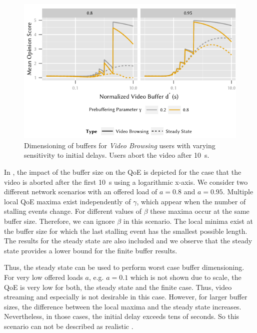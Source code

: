 \begin{figure}
  \centering
  \includegraphics{application/qoe_user_behaviour/user_scenarios/figures/video_browsing}
  \caption{Dimensioning of buffers for \emph{Video Browsing} users with varying  sensitivity to initial delays. Users abort the video after \SI{10}{\second}.}
  \label{fig:application:qoe_user_behaviour:typical_user_scenarios:browsing:video_browsing}
\end{figure}

In , the impact of the buffer size on the \gls{QoE} is depicted for the case that the video is aborted after the first \SI{10}{\second} using a logarithmic x-axis. 
We consider two different network scenarios with an offered load of \(a = 0.8\) and \(a = 0.95\).
Multiple local QoE maxima exist independently of \(\gamma\), which appear when the number of stalling events change. 
For different values of \(\beta\) these maxima occur at the same buffer size.
Therefore, we can ignore \(\beta\) in this scenario. 
The local minima exist at the buffer size for which the last stalling event has the smallest possible length. 
The results for the steady state are also included and we observe that the steady state provides a lower bound for the finite buffer results.

Thus, the steady state can be used to perform worst case buffer dimensioning.
For very low offered loads \(a\), e.g. \(a = 0.1\) which is not shown due to scale, the \gls{QoE} is very low for both, the steady state and the finite case. 
Thus, video streaming and especially \videoBrowsing is not desirable in this case. 
However, for larger buffer sizes, the difference between the local maxima and the steady state increases. 
Nevertheless, in those cases, the initial delay exceeds tens of seconds.
So this scenario can not be described as realistic \videoBrowsing.

